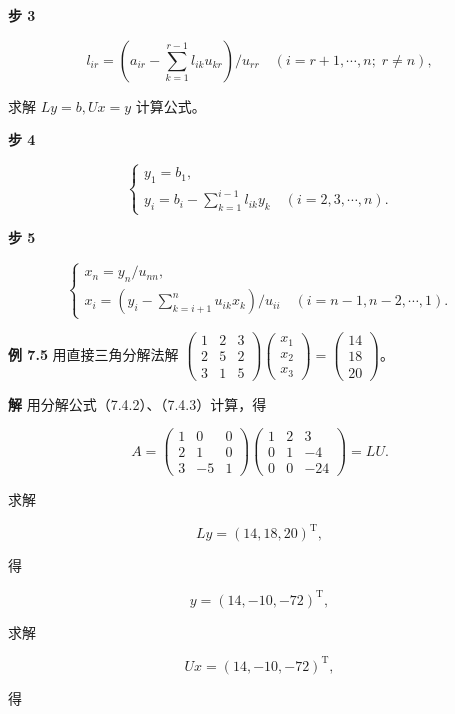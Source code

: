 \documentclass[
  10pt,
  fontset=fandol]{ctexart}
\begin{document}
\textbf{步 3}

\[l_{ir}=\left(a_{ir}-\sum_{k=1}^{r-1}l_{ik}u_{kr}\right)/u_{rr}\quad(i=r+1,\cdots,n;\;r\ne n),\tag{7.4.3}\]

求解 \(Ly=b,Ux=y\) 计算公式。

\textbf{步 4}

\[
\begin{cases}
y_1=b_1,\\
y_i=\displaystyle b_i-\sum_{k=1}^{i-1}l_{ik}y_k\quad(i=2,3,\cdots,n).
\end{cases}
\tag{7.4.4}
\]

\textbf{步 5}

\[
\begin{cases}
x_n=y_n/u_{nn},\\
x_i=\displaystyle\left(y_i-\sum_{k=i+1}^{n}u_{ik}x_k\right)/u_{ii}\quad(i=n-1,n-2,\cdots,1).
\end{cases}
\tag{7.4.5}
\]

\textbf{例 7.5} 用直接三角分解法解 \(\begin{pmatrix}1&2&3\\2&5&2\\3&1&5\end{pmatrix}\begin{pmatrix}x_1\\x_2\\x_3\end{pmatrix}=\begin{pmatrix}14\\18\\20\end{pmatrix}\)。

\textbf{解} 用分解公式（7.4.2）、（7.4.3）计算，得

\[A=\begin{pmatrix}1&0&0\\2&1&0\\3&-5&1\end{pmatrix}
\begin{pmatrix}1&2&3\\0&1&-4\\0&0&-24\end{pmatrix}=LU.\]

求解

\[Ly=(14,18,20)^{\mathrm T},\]

得

\[y=(14,-10,-72)^{\mathrm T},\]

求解

\[Ux=(14,-10,-72)^{\mathrm T},\]

得
\end{document}

